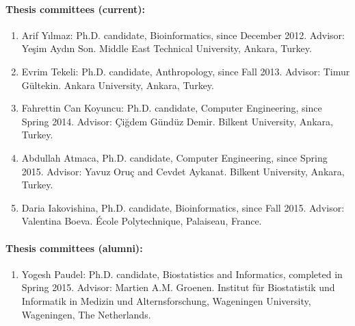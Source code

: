 \paragraph{Thesis committees (current):}

\begin{enumerate}

\item Arif Yılmaz: Ph.D. candidate, Bioinformatics, since December 2012. Advisor: Yeşim Aydın Son. Middle East Technical University, Ankara, Turkey.

\item Evrim Tekeli: Ph.D. candidate, Anthropology, since Fall 2013. Advisor: Timur Gültekin. Ankara University, Ankara, Turkey.

\item Fahrettin Can Koyuncu: Ph.D. candidate, Computer Engineering, since Spring 2014. Advisor: Çiğdem Gündüz Demir. Bilkent University, Ankara, Turkey.

\item Abdullah Atmaca, Ph.D. candidate, Computer Engineering, since Spring 2015. Advisor: Yavuz Oruç and Cevdet Aykanat. Bilkent University, Ankara, Turkey.

\item Daria Iakovishina, Ph.D. candidate, Bioinformatics, since Fall 2015. Advisor: Valentina Boeva. École Polytechnique, Palaiseau, France.
\end{enumerate}

\paragraph{Thesis committees (alumni):}
\begin{enumerate}

\item Yogesh Paudel: Ph.D. candidate, Biostatistics and Informatics, completed in Spring 2015. Advisor: Martien A.M. Groenen. Institut für Biostatistik und Informatik in Medizin und Alternsforschung, Wageningen University, Wageningen, The Netherlands.

\end{enumerate}
